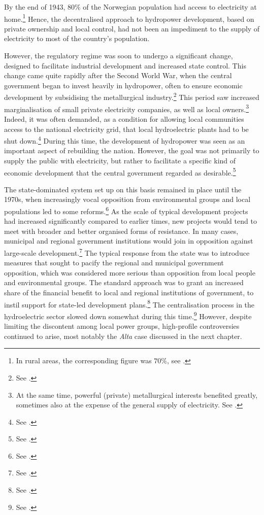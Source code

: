 By the end of 1943, $80 \%$ of the Norwegian population had access to electricity at home.\footnote{In rural areas, the corresponding figure was $70 \%$, see \cite[7]{utbygd46}.} Hence, the decentralised approach to hydropower development, based on private ownership and local control, had not been an impediment to the supply of electricity to most of the country's population.

However, the regulatory regime was soon to undergo a significant change, designed to facilitate industrial development and increased state control. This change came quite rapidly after the Second World War, when the central government began to invest heavily in hydropower, often to ensure economic development by subsidising the metallurgical industry.\footnote{See \cite[59-65]{thue96}.} This period saw increased marginalisation of small private electricity companies, as well as local owners.\footnote{At the same time, powerful (private) metallurgical interests benefited greatly, sometimes also at the expense of the general supply of electricity. See \cite[65-71]{thue96}.} Indeed, it was often demanded, as a condition for allowing local communities access to the national electricity grid, that local hydroelectric plants had to be shut down.\footnote{See \cite[111]{hindrum94}.} During this time, the development of hydropower was seen as an important aspect of rebuilding the nation. However, the goal was not primarily to supply the public with electricity, but rather to facilitate a specific kind of economic development that the central government regarded as desirable.\footnote{See \cite[59]{thue96}.}

The state-dominated system set up on this basis remained in place until the 1970s, when increasingly vocal opposition from environmental groups and local populations led to some reforms.\footnote{See \cite[71-75]{thue96}.} As the scale of typical development projects had increased significantly compared to earlier times, new projects would tend to meet with broader and better organised forms of resistance. In many cases, municipal and regional government institutions would join in opposition against large-scale development.\footnote{See \cite[71-72]{thue96}.} The typical response from the state was to introduce measures that sought to pacify the regional and municipal government opposition, which was considered more serious than opposition from local people and environmental groups. The standard approach was to grant an increased share of the financial benefit to local and regional institutions of government, to instil support for state-led development plans.\footnote{See \cite[73-76]{nilsen08}.} The centralisation process in the hydroelectric sector slowed down somewhat during this time.\footnote{See \cite[85]{thue96}.} However, despite limiting the discontent among local power groups, high-profile controversies continued to arise, most notably the {\it Alta} case discussed in the next chapter.

